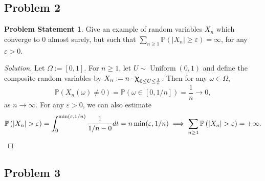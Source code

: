 \documentclass[12pt,reqno]{article}
\theoremstyle{plain}
\theoremstyle{definition}
\newtheorem{problem}[theorem]{Problem Statement}
\newcommand{\PP}[1]{\ensuremath{\mathbb{P}\left(#1\right)}}
\renewcommand{\chi}{\scalebox{1.25}{$\upchi$}}
\begin{document}
\subsection{Problem 2}

\begin{problem}
Give an example of random variables $X_n$ which converge to $0$ almost 
surely, but such that $\sum_{n \geq 1} \PP{|X_n| \geq \varepsilon} = \infty$, 
for any $\varepsilon > 0$. 
\end{problem}
\begin{proof}[Solution] 
Let $\Omega := [0, 1]$. 
For $n \geq 1$, let $U \sim \operatorname{Uniform}(0,1)$ and 
define the composite random variables by 
$X_n := n \cdot \chi_{0 \leq U \leq \frac{1}{n}}$. Then for any 
$\omega \in \Omega$, 
\[
\PP{X_n(\omega) \neq 0} = \PP{\omega \in [0, 1/n]} = \frac{1}{n} 
     \longrightarrow 0, 
\]
as $n \rightarrow \infty$. For any $\varepsilon > 0$, we can also estimate 
\[
\PP{|X_n| > \varepsilon} = 
     \int_0^{\min(\varepsilon, 1/n)} \frac{1}{1/n-0} dt = 
     n \min(\varepsilon, 1/n) \implies 
     \sum_{n \geq 1} \PP{|X_n| > \varepsilon} = +\infty. 
     \qedhere
\]
\end{proof} 

\subsection{Problem 3}
\end{document}

